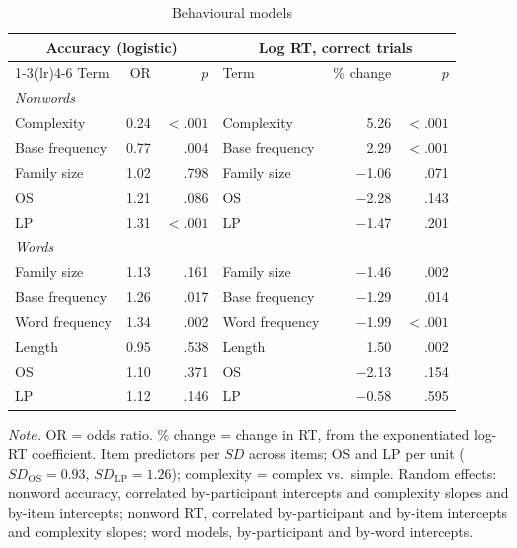 \begin{table}[htbp]
\centering
\caption{Behavioural models}
\label{tab:behaviour}
\begin{tabular}{lrrlrr}
\toprule
\multicolumn{3}{c}{Accuracy (logistic)} & \multicolumn{3}{c}{Log RT, correct trials} \\
\cmidrule(lr){1-3}\cmidrule(lr){4-6}
Term & OR & $p$ & Term & \% change & $p$ \\
\midrule
\multicolumn{6}{l}{\textit{Nonwords}} \\
Complexity      & 0.24 & $<.001$ & Complexity      & 5.26    & $<.001$ \\
Base frequency  & 0.77 & .004    & Base frequency  & 2.29    & $<.001$ \\
Family size     & 1.02 & .798    & Family size     & $-$1.06 & .071 \\
OS              & 1.21 & .086    & OS              & $-$2.28 & .143 \\
LP              & 1.31 & $<.001$ & LP              & $-$1.47 & .201 \\
\multicolumn{6}{l}{\textit{Words}} \\
Family size     & 1.13 & .161    & Family size     & $-$1.46 & .002 \\
Base frequency  & 1.26 & .017    & Base frequency  & $-$1.29 & .014 \\
Word frequency  & 1.34 & .002    & Word frequency  & $-$1.99 & $<.001$ \\
Length          & 0.95 & .538    & Length          & 1.50    & .002 \\
OS              & 1.10 & .371    & OS              & $-$2.13 & .154 \\
LP              & 1.12 & .146    & LP              & $-$0.58 & .595 \\
\bottomrule
\end{tabular}

\vspace{2pt}
\begin{minipage}{0.85\linewidth}\footnotesize
\textit{Note.} OR = odds ratio. \% change = change in RT, from the exponentiated
log-RT coefficient. Item predictors per $SD$ across items; OS and LP per unit
($SD_{\text{OS}} = 0.93$, $SD_{\text{LP}} = 1.26$); complexity = complex vs.\
simple. Random effects: nonword accuracy, correlated by-participant intercepts
and complexity slopes and by-item intercepts; nonword RT, correlated
by-participant and by-item intercepts and complexity slopes; word models,
by-participant and by-word intercepts.
\end{minipage}
\end{table}

